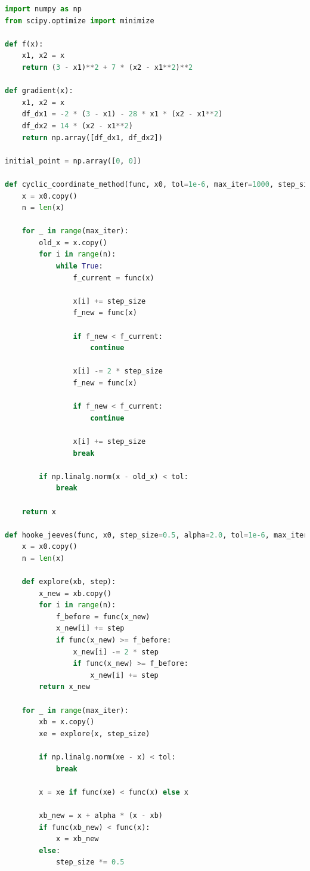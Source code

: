 \documentclass{article}
\begin{document}
\begin{lstlisting}[language=Python]
import numpy as np
from scipy.optimize import minimize

def f(x):
    x1, x2 = x
    return (3 - x1)**2 + 7 * (x2 - x1**2)**2

def gradient(x):
    x1, x2 = x
    df_dx1 = -2 * (3 - x1) - 28 * x1 * (x2 - x1**2)
    df_dx2 = 14 * (x2 - x1**2)
    return np.array([df_dx1, df_dx2])

initial_point = np.array([0, 0])

def cyclic_coordinate_method(func, x0, tol=1e-6, max_iter=1000, step_size=0.1):
    x = x0.copy()
    n = len(x)
    
    for _ in range(max_iter):
        old_x = x.copy()
        for i in range(n):
            while True:
                f_current = func(x)
                
                x[i] += step_size
                f_new = func(x)
                
                if f_new < f_current:
                    continue
                
                x[i] -= 2 * step_size
                f_new = func(x)
                
                if f_new < f_current:
                    continue
                
                x[i] += step_size
                break
        
        if np.linalg.norm(x - old_x) < tol:
            break
    
    return x

def hooke_jeeves(func, x0, step_size=0.5, alpha=2.0, tol=1e-6, max_iter=1000):
    x = x0.copy()
    n = len(x)
    
    def explore(xb, step):
        x_new = xb.copy()
        for i in range(n):
            f_before = func(x_new)
            x_new[i] += step
            if func(x_new) >= f_before:
                x_new[i] -= 2 * step
                if func(x_new) >= f_before:
                    x_new[i] += step
        return x_new
    
    for _ in range(max_iter):
        xb = x.copy()
        xe = explore(x, step_size)
        
        if np.linalg.norm(xe - x) < tol:
            break
        
        x = xe if func(xe) < func(x) else x
        
        xb_new = x + alpha * (x - xb)
        if func(xb_new) < func(x):
            x = xb_new
        else:
            step_size *= 0.5
    

\end{lstlisting}
\end{document}
